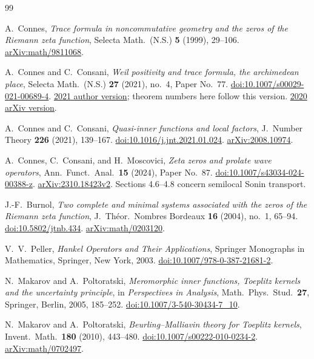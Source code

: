 \documentclass[11pt]{article}
\numberwithin{equation}{section}
\theoremstyle{definition}
\theoremstyle{remark}
\begin{document}
\begin{thebibliography}{99}

A.~Connes,
\emph{Trace formula in noncommutative geometry and the zeros of the
Riemann zeta function},
Selecta Math.\ (N.S.) \textbf{5} (1999), 29--106.
\href{https://arxiv.org/abs/math/9811068}{arXiv:math/9811068}.

A.~Connes and C.~Consani,
\emph{Weil positivity and trace formula, the archimedean place},
Selecta Math.\ (N.S.) \textbf{27} (2021), no.~4, Paper No.~77.
\href{https://doi.org/10.1007/s00029-021-00689-4}
{doi:10.1007/s00029-021-00689-4}.
\href{https://alainconnes.org/wp-content/uploads/Selecta.pdf}
{2021 author version}; theorem numbers here follow this version.
\href{https://arxiv.org/abs/2006.13771}{2020 arXiv version}.

A.~Connes and C.~Consani,
\emph{Quasi-inner functions and local factors},
J.\ Number Theory \textbf{226} (2021), 139--167.
\href{https://doi.org/10.1016/j.jnt.2021.01.024}
{doi:10.1016/j.jnt.2021.01.024}.
\href{https://arxiv.org/abs/2008.10974}{arXiv:2008.10974}.

A.~Connes, C.~Consani, and H.~Moscovici,
\emph{Zeta zeros and prolate wave operators},
Ann.\ Funct.\ Anal.\ \textbf{15} (2024), Paper No.~87.
\href{https://doi.org/10.1007/s43034-024-00388-z}
{doi:10.1007/s43034-024-00388-z}.
\href{https://arxiv.org/abs/2310.18423v2}{arXiv:2310.18423v2}.
Sections 4.6--4.8 concern semilocal Sonin transport.

J.-F.~Burnol,
\emph{Two complete and minimal systems associated with the zeros of
the Riemann zeta function},
J.\ Th\'eor.\ Nombres Bordeaux \textbf{16} (2004), no.~1, 65--94.
\href{https://doi.org/10.5802/jtnb.434}{doi:10.5802/jtnb.434}.
\href{https://arxiv.org/abs/math/0203120}{arXiv:math/0203120}.

V.~V.~Peller,
\emph{Hankel Operators and Their Applications},
Springer Monographs in Mathematics, Springer, New York, 2003.
\href{https://doi.org/10.1007/978-0-387-21681-2}
{doi:10.1007/978-0-387-21681-2}.

N.~Makarov and A.~Poltoratski,
\emph{Meromorphic inner functions, Toeplitz kernels and the uncertainty
principle}, in \emph{Perspectives in Analysis},
Math.\ Phys.\ Stud.\ \textbf{27}, Springer, Berlin, 2005, 185--252.
\href{https://doi.org/10.1007/3-540-30434-7_10}
{doi:10.1007/3-540-30434-7\_10}.

N.~Makarov and A.~Poltoratski,
\emph{Beurling--Malliavin theory for Toeplitz kernels},
Invent.\ Math.\ \textbf{180} (2010), 443--480.
\href{https://doi.org/10.1007/s00222-010-0234-2}
{doi:10.1007/s00222-010-0234-2}.
\href{https://arxiv.org/abs/math/0702497}{arXiv:math/0702497}.


\end{thebibliography}
\end{document}
